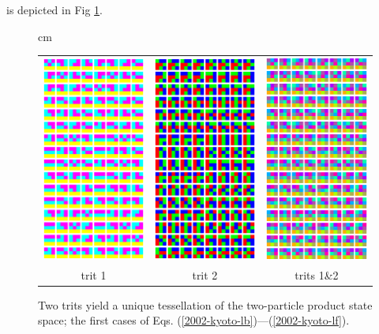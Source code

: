 is depicted in Fig \ref{2002-kyoto-f1}.
\begin{figure}
\begin{center}
 cm
\begin{tabular}{ccc}
 \includegraphics[width=4.1cm]{2002-kyoto-f1.eps} &
 \includegraphics[width=4.1cm]{2002-kyoto-f2.eps} &
 \includegraphics[width=4.1cm]{2002-kyoto-f1u2.eps}\\
trit 1&trit 2& trits 1\&2
\end{tabular}
\end{center}
\caption{Two trits yield a unique tessellation of the two-particle product state space; the first cases of Eqs.
(\ref{2002-kyoto-lb})---(\ref{2002-kyoto-lf}).\label{2002-kyoto-f1}}
\end{figure}

